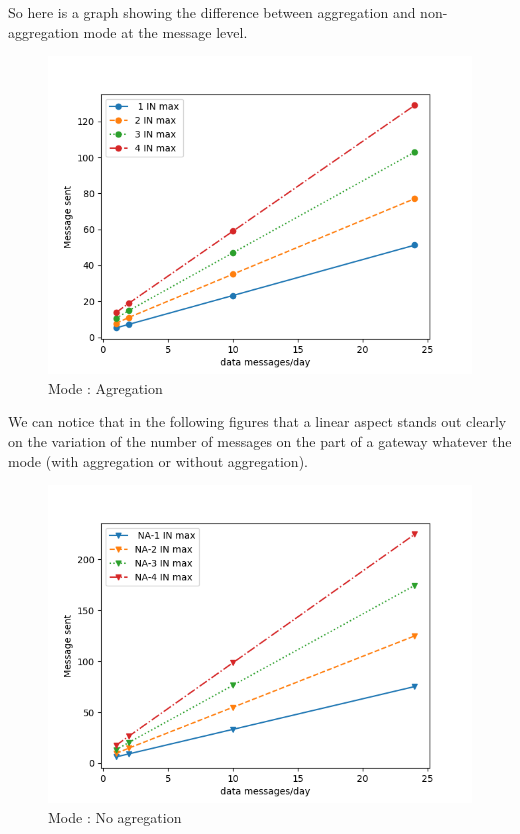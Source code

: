 \documentclass[conference]{IEEEtran}
\begin{document}
So here is a graph showing the difference between aggregation and non-aggregation mode at the message level. 
\begin{figure}[htbp]
\centerline{\includegraphics[scale=0.5]{graphics_resultats/A/A.png}}
\caption{Mode : Agregation}
\label{A}
\end{figure}
We can notice that in the following figures that a linear aspect stands out clearly on the variation of the number of messages on the part of a gateway whatever the mode (with aggregation or without aggregation).
\begin{figure}[htbp]
\centerline{\includegraphics[scale=0.5]{graphics_resultats/A/NA.png}}
\caption{Mode : No agregation}
\label{A}
\end{figure}
\end{document}
